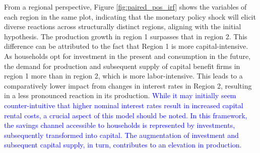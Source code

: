 \documentclass[../thesis.tex]{subfiles}
\begin{document}


From a regional perspective, Figure \eqref{fig:paired_pos_irf} shows the variables of each region in the same plot, indicating that the monetary policy shock will elicit diverse reactions across structurally distinct regions, aligning with the initial hypothesis. The production growth in region 1 surpasses that in region 2. This difference can be attributed to the fact that Region 1 is more capital-intensive. As households opt for investment in the present and consumption in the future, the demand for production and subsequent supply of capital benefit firms in region 1 more than in region 2, which is more labor-intensive. This leads to a comparatively lower impact from changes in interest rates in Region 2, resulting in a less pronounced reaction in its production. \textcolor{blue}{While it may initially seem counter-intuitive that higher nominal interest rates result in increased capital rental costs, a crucial aspect of this model should be noted. In this framework, the savings channel accessible to households is represented by investments, subsequently transformed into capital. The augmentation of investment and subsequent capital supply, in turn, contributes to an elevation in production.}
\end{document}
